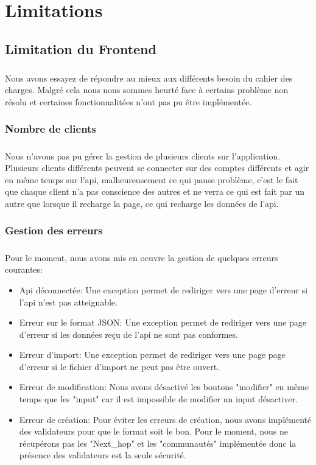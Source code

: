 \chapter{Limitations}

\section{Limitation du Frontend}
\paragraph{}Nous avons essayez de répondre au mieux aux différents besoin du cahier des charges. Malgré cela nous nous sommes heurté face à certains problème non résolu et certaines fonctionnalitées n'ont pas pu être implémentée.

\subsection{Nombre de clients}
\paragraph{}Nous n'avons pas pu gérer la gestion de plusieurs clients sur l'application. Plusieurs clients différents peuvent se connecter sur des comptes différents et agir en même temps sur l'api, malheureusement ce qui pause problème, c'est le fait que chaque client n'a pas conscience des autres et ne verra ce qui est fait par un autre que lorsque il recharge la page, ce qui recharge les données de l'api.

\subsection{Gestion des erreurs}
\paragraph{}Pour le moment, nous avons mis en oeuvre la gestion de quelques erreurs courantes:
\begin{itemize}
    \item Api déconnectée: Une exception permet de rediriger vers une page d'erreur si l'api n'est pas atteignable.
    \item Erreur sur le format JSON: Une exception permet de rediriger vers une page d'erreur si les données reçu de l'api ne sont pas conformes.
    \item Erreur d'import: Une exception permet de rediriger vers une page page d'erreur si le fichier d'import ne peut pas être ouvert.
    \item Erreur de modification: Nous avons désactivé les boutons "modifier" en même temps que les "input" car il est impossible de modifier un input désactiver. 
    \item Erreur de création: Pour éviter les erreurs de création, nous avons implémenté des validateurs pour que le format soit le bon. Pour le moment, nous ne récupérons pas les "Next\_hop" et les "communautés" implémentée donc la présence des validateurs est la seule sécurité.
\end{itemize}

